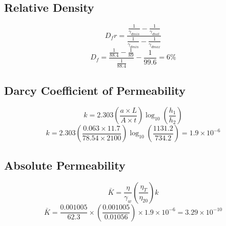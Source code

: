 \documentclass{article}
\begin{document}
\subsection{Relative Density} 
\[D_fr=\frac{\frac{1}{\gamma_{d min}}-\frac{1}{\gamma_{d nat}}}{\frac{1}{\gamma_{d min}}-\frac{1}{\gamma_{d max}}}\]
\[D_f=\frac{\frac{1}{88.4}-\frac{1}{89}}{\frac{1}{88.4}}-\frac{1}{99.6}=\boxed{6\%}\]
\subsection{Darcy Coefficient of Permeability} 
\[k=2.303\left(\frac{a\times L}{A\times t}\right)\log_{10}\left(\frac{h_1}{h_2}\right)\]
\[k=2.303\left(\frac{0.063\times 11.7}{78.54\times 2100}\right)\log_{10}\left(\frac{1131.2}{734.2}\right)=\boxed{1.9\times 10^{-6}}\]
\subsection{Absolute Permeability}
\[\bar{K}=\frac{\eta}{\gamma_w}\left(\frac{\eta_T}{\eta_{20}}\right)k\]
\[\bar{K}=\frac{0.001005}{62.3}\times \left(\frac{0.001005}{0.01056}\right)\times 1.9\times 10^{-6}=\boxed{3.29\times 10^{-10}}\]
\end{document}
